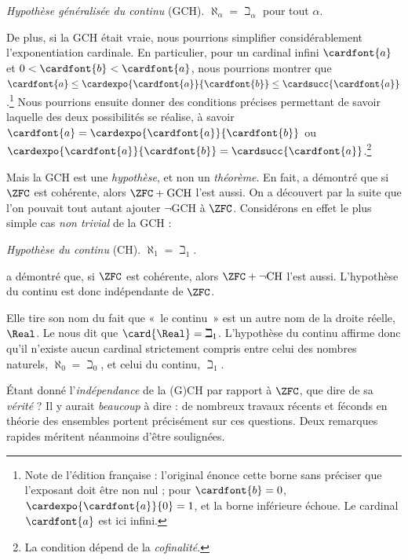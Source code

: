 \documentclass[../../../include/open-logic-section]{subfiles}
\begin{document}
\begin{defish}
\emph{Hypothèse généralisée du continu} (GCH).
$\aleph_\alpha = \beth_\alpha$ pour tout $\alpha$.
\end{defish}

De plus, si la GCH était vraie, nous pourrions
simplifier considérablement l'exponentiation
cardinale. En particulier, pour un cardinal
infini $\cardfont{a}$ et $0<\cardfont{b}<\cardfont{a}$,
nous pourrions montrer que
$\cardfont{a}
\leq \cardexpo{\cardfont{a}}{\cardfont{b}}
\leq \cardsucc{\cardfont{a}}$.\footnote{
Note de l'édition française : l'original énonce
cette borne sans préciser que l'exposant doit
être non nul ; pour $\cardfont{b}=0$,
$\cardexpo{\cardfont{a}}{0}=1$,
et la borne inférieure échoue. Le cardinal
$\cardfont{a}$ est ici infini.}
Nous pourrions ensuite donner des conditions
précises permettant de savoir laquelle des
deux possibilités se réalise, à savoir
$\cardfont{a}
= \cardexpo{\cardfont{a}}{\cardfont{b}}$
ou
$\cardexpo{\cardfont{a}}{\cardfont{b}}
= \cardsucc{\cardfont{a}}$.\footnote{
La condition dépend de la \emph{cofinalité}.}

Mais la GCH est une \emph{hypothèse}, et non
un \emph{théorème}. En fait, \citet{Godel1938}
a démontré que si $\ZFC$ est cohérente, alors
$\ZFC + \text{GCH}$ l'est aussi. On a découvert
par la suite que l'on pouvait tout autant ajouter
$\lnot$GCH à $\ZFC$. Considérons en effet le
plus simple cas \emph{non trivial} de la GCH :

\begin{defish}
\emph{Hypothèse du continu} (CH).
$\aleph_1 = \beth_1$.
\end{defish}

\citet{Cohen1963} a démontré que, si $\ZFC$
est cohérente, alors
$\ZFC + \lnot\text{CH}$ l'est aussi.
L'hypothèse du continu est donc indépendante
de $\ZFC$.

Elle tire son nom du fait que «~le continu~»
est un autre nom de la droite réelle, $\Real$.
Le  nous dit que
$\card{\Real} = \beth_1$. L'hypothèse du continu
affirme donc qu'il n'existe aucun cardinal
strictement compris entre celui des nombres
naturels, $\aleph_0 = \beth_0$, et celui
du continu, $\beth_1$.

Étant donné l'\emph{indépendance} de la (G)CH
par rapport à $\ZFC$, que dire de sa
\emph{vérité} ? Il y aurait \emph{beaucoup}
à dire : de nombreux travaux récents et féconds
en théorie des ensembles portent précisément
sur ces questions. Deux remarques rapides
méritent néanmoins d'être soulignées.
\end{document}
